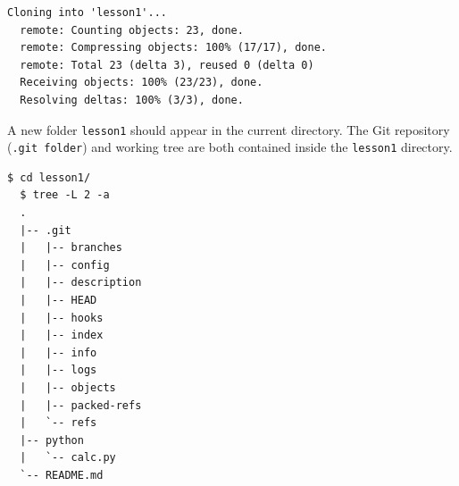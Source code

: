 \documentclass[a4paper]{../../common/tufte-latex/tufte-handout}
\begin{document}
\begin{lstlisting}[style=BashInputStyle]
  Cloning into 'lesson1'...
  remote: Counting objects: 23, done.
  remote: Compressing objects: 100% (17/17), done.
  remote: Total 23 (delta 3), reused 0 (delta 0)
  Receiving objects: 100% (23/23), done.
  Resolving deltas: 100% (3/3), done.
\end{lstlisting}

\newpage

A new folder \texttt{lesson1} should appear in the current directory.
The Git repository (\texttt{.git folder}) and working tree are both contained inside the \texttt{lesson1} directory.

\begin{lstlisting}[style=BashInputStyle]
  $ cd lesson1/
  $ tree -L 2 -a 
  .
  |-- .git
  |   |-- branches
  |   |-- config
  |   |-- description
  |   |-- HEAD
  |   |-- hooks
  |   |-- index
  |   |-- info
  |   |-- logs
  |   |-- objects
  |   |-- packed-refs
  |   `-- refs
  |-- python
  |   `-- calc.py
  `-- README.md
\end{lstlisting}
\end{document}
